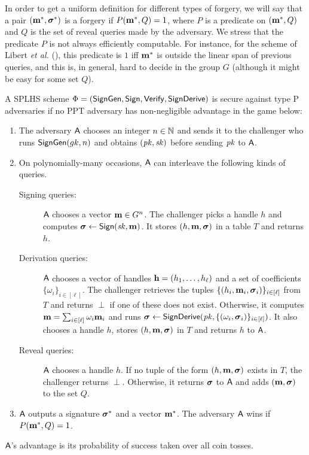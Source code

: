 \label{splhs-unforgeability}

In order to get a uniform definition for different types of forgery, we will say that a pair
$(\mathbf{m}^*,{\boldsymbol \sigma}^*)$ is a forgery if $P(\mathbf{m}^*, Q)=1$, where
$P$ is a predicate on $(\mathbf{m}^*, Q)$ and $Q$ is the set of reveal queries
made by the adversary. We stress that the predicate $P$ is not always efficiently computable. For instance, for the scheme of Libert \textit{et al.} (\cite{C:LPJY13}), this predicate is $1$ iff $\mathbf{m}^*$ is outside the linear span of 
previous queries, and this is, in general, hard to decide in the group $G$ (although it might be easy for some set $Q$).  

\begin{definition} A SPLHS scheme $\Phi = (\mathsf{SignGen}, \mathsf{Sign}, \mathsf{Verify}, \mathsf{SignDerive})$ is secure against type P adversaries if no PPT
adversary has non-negligible advantage in the game below:
\begin{enumerate}
\item The adversary $\mathsf{A}$ chooses an integer $n \in \mathbb{N}$ and sends it to the challenger who runs
$\mathsf{SignGen}(gk, n)$
and obtains $(\mathit{pk},\mathit{sk})$ before sending $\mathit{pk}$ to $\mathsf{A}$.
\item On polynomially-many occasions, $\mathsf{A}$ can interleave the following kinds of queries.
\begin{description}

\item[Signing queries:] $\mathsf{A}$ chooses a vector $\mathbf{m}\in G^n$.
The challenger picks a handle
$h$ and computes ${\boldsymbol \sigma}\gets\mathsf{Sign}(\mathit{sk}, \mathbf{m})$. It stores $(h,\mathbf{m}, {\boldsymbol \sigma})$
in a table $T$ and returns $h$.

\item[Derivation queries:] $\mathsf{A}$ chooses a vector of handles $\mathbf{h} = (h_1, \ldots , h_\ell)$ and a set of coefficients
$\{\omega_i\}_{i\in[\ell]}$. The challenger retrieves the tuples $\{(h_i,\mathbf{m}_i, {\boldsymbol \sigma}_i)\}_{i\in[\ell]}$
from $T$ and returns $\perp$ if one
of these does not exist. Otherwise, it computes
$\mathbf{m} = \sum_{i\in[\ell]} \omega_i\mathbf{m}_i$ and runs
${\boldsymbol \sigma}\gets\mathsf{SignDerive}(\mathit{pk},\{(\omega_i,{\boldsymbol \sigma}_i)\}_{i\in[\ell]})$.
It also chooses a handle $h$, stores $(h,\mathbf{m}, {\boldsymbol \sigma})$ in $T$ and returns $h$
to $\mathsf{A}$.

\item[Reveal queries:] $\mathsf{A}$ chooses a handle $h$. If no tuple of the form $(h,\mathbf{m},{\boldsymbol \sigma})$
exists in $T$, the challenger returns $\perp$. Otherwise, it returns ${\boldsymbol \sigma}$
to $\mathsf{A}$ and adds $(\mathbf{m}, {\boldsymbol \sigma})$ to the set $Q$.
\end{description}

\item $\mathsf{A}$ outputs a signature ${\boldsymbol \sigma}^*$ and a vector $\mathbf{m}^*$.
The adversary $\mathsf{A}$ wins if $P(\mathbf{m}^*,Q)=1$.
\end{enumerate}
$\mathsf{A}$’s advantage is its probability of success taken over all coin tosses.
\end{definition}

